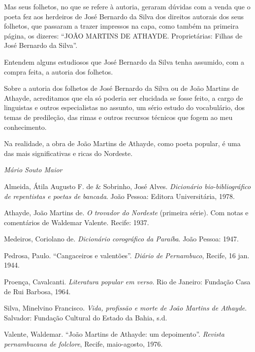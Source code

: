Mas seus folhetos, no que se refere à autoria, geraram
dúvidas com a venda que o poeta fez aos herdeiros de José
Bernardo da Silva dos direitos autorais dos seus folhetos,
que passaram a trazer impressos na capa, como também
na primeira página, os dizeres: ``JOÃO MARTINS DE
ATHAYDE. Proprietárias: Filhas de José Bernardo da
Silva''.

Entendem alguns estudiosos que José Bernardo da Silva
tenha assumido, com a compra feita, a autoria dos folhetos.

Sobre a autoria dos folhetos de José Bernardo da Silva
ou de João Martins de Athayde, acreditamos que ela só
poderia ser elucidada se fosse feito, a cargo de linguistas e
outros especialistas no assunto, um sério estudo do
vocabulário, dos temas de predileção, das rimas e outros
recursos técnicos que fogem ao meu conhecimento.

Na realidade, a obra de João Martins de Athayde, como
poeta popular, é uma das mais significativas e ricas do
Nordeste.

\begin{flushright}
\textit{Mário Souto Maior}\\
\end{flushright}



\begin{bibliohedra}

\item Almeida, Átila Augusto F. de \& Sobrinho, José Alves.
\textit{Dicionário bio-bibliográfico de repentistas e poetas de
bancada}. João Pessoa: Editora Universitária, 1978.

\item Athayde, João Martins de. \textit{O trovador do Nordeste} (primeira
série). Com notas e comentários de Waldemar Valente.
Recife: 1937.

\item Medeiros, Coriolano de. \textit{Dicionário corográfico da Paraíba}.
João Pessoa: 1947.

\item Pedrosa, Paulo. ``Cangaceiros e valentões''. \textit{Diário de
Pernambuco}, Recife, 16 jan. 1944.

\item Proença, Cavalcanti. \textit{Literatura popular em verso}. Rio de
Janeiro: Fundação Casa de Rui Barbosa, 1964.

\item Silva, Minelvino Francisco. \textit{Vida, profissão e morte de João
Martins de Athayde}. Salvador: Fundação Cultural do
Estado da Bahia, s.d.

\item Valente, Waldemar. ``João Martins de Athayde: um
depoimento''. \textit{Revista pernambucana de folclore}, Recife,
maio-agosto, 1976.

\end{bibliohedra}